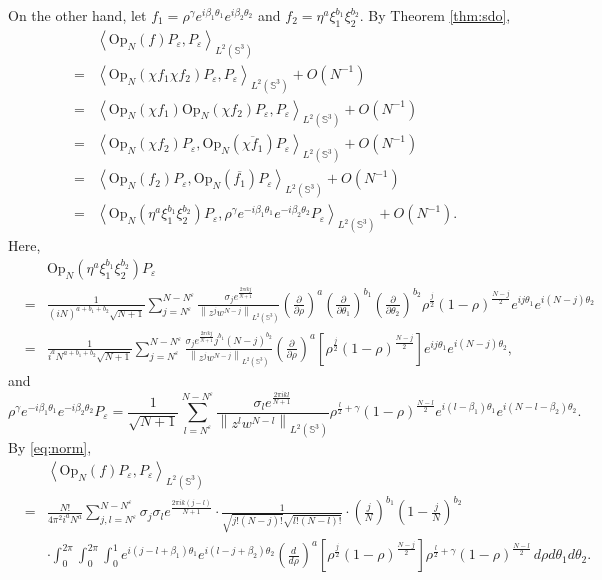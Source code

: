 \documentclass[12pt,reqno]{amsart}
\newcommand\ol{\overline}
\newcommand\Op{\mathrm{Op}}
\newcommand\Sb{\mathbb{S}}
\newcommand\ve{\varepsilon}
\theoremstyle{plain}
\theoremstyle{remark}
\numberwithin{equation}{section}
\begin{document}
On the other hand, let $f_1=\rho^\gamma e^{i\beta_1\theta_1}e^{i\beta_2\theta_2}$ and $f_2=\eta^a\xi_1^{b_1}\xi_2^{b_2}$.  By Theorem \ref{thm:sdo},
\begin{eqnarray*}
&&\left\langle\Op_N(f)P_\ve,P_\ve\right\rangle_{L^2(\Sb^3)}\\&=&\left\langle\Op_N\left(\chi f_1\chi f_2\right)P_\ve,P_\ve\right\rangle_{L^2(\Sb^3)}+O\left(N^{-1}\right)\\
&=&\left\langle\Op_N\left(\chi f_1\right)\Op_N\left(\chi f_2\right)P_\ve,P_\ve\right\rangle_{L^2(\Sb^3)}+O\left(N^{-1}\right)\\
&=&\left\langle\Op_N\left(\chi f_2\right)P_\ve,\Op_N\left(\ol{\chi f_1}\right)P_\ve\right\rangle_{L^2(\Sb^3)}+O\left(N^{-1}\right)\\
&=&\left\langle\Op_N\left(f_2\right)P_\ve,\Op_N\left(\ol{f_1}\right)P_\ve\right\rangle_{L^2(\Sb^3)}+O\left(N^{-1}\right)\\
&=&\left\langle\Op_N\left(\eta^a\xi_1^{b_1}\xi_2^{b_2}\right)P_\ve,\rho^\gamma e^{-i\beta_1\theta_1}e^{-i\beta_2\theta_2}P_\ve\right\rangle_{L^2(\Sb^3)}+O\left(N^{-1}\right).
\end{eqnarray*}
Here,
\begin{eqnarray*}
&&\Op_N\left(\eta^a\xi_1^{b_1}\xi_2^{b_2}\right)P_\ve\\
&=&\frac{1}{(iN)^{a+b_1+b_2}\sqrt{N+1}}\sum_{j=N^\ve}^{N-N^\ve}\frac{\sigma_je^{\frac{2\pi ikj}{N+1}}}{\left\|z^jw^{N-j}\right\|_{L^2(\Sb^3)}}\left(\frac{\partial}{\partial\rho}\right)^a\left(\frac{\partial}{\partial\theta_1}\right)^{b_1}\left(\frac{\partial}{\partial\theta_2}\right)^{b_2}\rho^\frac j2(1-\rho)^{\frac{N-j}{2}}e^{ij\theta_1}e^{i(N-j)\theta_2}\\
&=&\frac{1}{i^aN^{a+b_1+b_2}\sqrt{N+1}}\sum_{j=N^\ve}^{N-N^\ve}\frac{\sigma_je^{\frac{2\pi ikj}{N+1}}j^{b_1}(N-j)^{b_2}}{\left\|z^jw^{N-j}\right\|_{L^2(\Sb^3)}}\left(\frac{\partial}{\partial\rho}\right)^a\left[\rho^\frac j2(1-\rho)^{\frac{N-j}{2}}\right]e^{ij\theta_1}e^{i(N-j)\theta_2},
\end{eqnarray*}
and
$$\rho^\gamma e^{-i\beta_1\theta_1}e^{-i\beta_2\theta_2}P_\ve=\frac{1}{\sqrt{N+1}}\sum_{l=N^\ve}^{N-N^\ve}\frac{\sigma_le^{\frac{2\pi ikl}{N+1}}}{\left\|z^lw^{N-l}\right\|_{L^2(\Sb^3)}}\rho^{\frac l2+\gamma}(1-\rho)^{\frac{N-l}{2}}e^{i\left(l-\beta_1\right)\theta_1}e^{i\left(N-l-\beta_2\right)\theta_2}.$$
By \eqref{eq:norm},
\begin{eqnarray*}
&&\left\langle\Op_N(f)P_\ve,P_\ve\right\rangle_{L^2(\Sb^3)}\\
&=&\frac{N!}{4\pi^2i^aN^a}\sum_{j,l=N^\ve}^{N-N^\ve}\sigma_j\sigma_le^{\frac{2\pi ik(j-l)}{N+1}}\cdot\frac{1}{\sqrt{j!(N-j)!}\sqrt{l!(N-l)!}}\cdot\left(\frac jN\right)^{b_1}\left(1-\frac jN\right)^{b_2}\\
&&\cdot\int_0^{2\pi}\int_0^{2\pi}\int_0^1e^{i\left(j-l+\beta_1\right)\theta_1}e^{i\left(l-j+\beta_2\right)\theta_2}\left(\frac{d}{d\rho}\right)^a\left[\rho^\frac j2(1-\rho)^{\frac{N-j}{2}}\right]\rho^{\frac l2+\gamma}(1-\rho)^{\frac{N-l}{2}}\,d\rho d\theta_1d\theta_2.
\end{eqnarray*}
\end{document}
